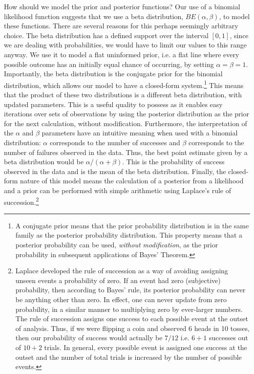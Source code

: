 \documentclass[USenglish,letterpaper,12pt,extrafontsizes,oneside,onecolumn,final]{memoir}
\begin{document}
How should we model the prior and posterior functions?  Our use of a binomial likelihood function suggests that we use a beta distribution, $BE(\alpha,\beta)$, to model these functions.  There are several reasons for this perhaps seemingly arbitrary choice.  The beta distribution has a defined support over the interval $[0,1]$, since we are dealing with probabilities, we would have to limit our values to this range anyway.  We use it to model a flat uninformed prior, i.e. a flat line where every possible outcome has an initially equal chance of occurring, by setting $\alpha = \beta = 1$.  Importantly, the beta distribution is the conjugate prior for the binomial distribution, which allows our model to have a closed-form system.\footnote{A conjugate prior means that the prior probability distribution is in the same family as the posterior probability distribution.  This property means that a posterior probability can be used, \emph{without modification}, as the prior probability in subsequent applications of Bayes' Theorem.} This means that the product of these two distributions is a different beta distribution, with updated parameters. This is a useful quality to possess as it enables easy iterations over sets of observations by using the posterior distribution as the prior for the next calculation, without modification.  Furthermore, the interpretation of the $\alpha$ and $\beta$ parameters have an intuitive meaning when used with a binomial distribution: $\alpha$ corresponds to the number of successes and $\beta$ corresponds to the number of failures observed in the data. Thus, the best point estimate given by a beta distribution would be $\alpha/(\alpha+\beta)$.  This is the probability of success observed in the data and is the mean of the beta distribution.  Finally, the closed-form nature of this model means the calculation of a posterior from a likelihood and a prior can be performed with simple arithmetic using Laplace's rule of succession.\footnote{Laplace developed the rule of succession as a way of avoiding assigning unseen events a probability of zero.  If an event had zero (subjective) probability, then according to Bayes' rule, its posterior probability can never be anything other than zero. In effect, one can never update from zero probability, in a similar manner to multiplying zero by ever-larger numbers. The rule of succession assigns one success to each possible event at the outset of analysis.  Thus, if we were flipping a coin and observed 6 heads in 10 tosses, then our probability of success would actually be $ 7/12 $ i.e. $6 + 1$ successes out of $10 + 2$ trials.  In general, every possible event is assigned one success at the outset and the number of total trials is increased by the number of possible events.}
\end{document}

